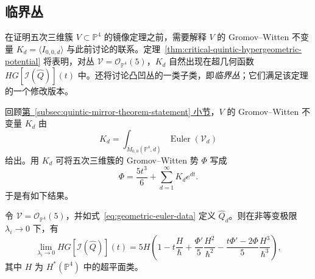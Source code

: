 \subsection{临界丛}\label{subsec:critical-bundles}
\hypertarget{source:373-batch8}{}
在证明五次三维簇 $V\subset\mathbb P^4$ 的镜像定理之前，需要解释 $V$ 的 Gromov--Witten 不变量 $K_d=\langle I_{0,0,d}\rangle$ 与此前讨论的联系。定理~\ref{thm:critical-quintic-hypergeometric-potential} 将表明，对丛 $\mathcal V=\mathcal O_{\mathbb P^4}(5)$，$K_d$ 自然出现在超几何函数 $HG[\mathcal I(\widehat Q)](t)$ 中。还将讨论凸凹丛的一类子类，即\emph{临界丛}；它们满足该定理的一个修改版本。

回顾\hyperref[subsec:quintic-mirror-theorem-statement]{第~\ref*{subsec:quintic-mirror-theorem-statement} 小节}，$V$ 的 Gromov--Witten 不变量 $K_d$ 由
\[
K_d=\int_{\overline M_{0,0}(\mathbb P^4,d)}\operatorname{Euler}(\mathcal V_d)
\]
给出。用 $K_d$ 可将五次三维簇的 Gromov--Witten 势 $\Phi$ 写成
\[
\Phi=\frac{5t^3}{6}+\sum_{d=1}^{\infty}K_de^{dt}.
\]
于是有如下结果。
\begin{theorem}\label{thm:critical-quintic-hypergeometric-potential}
令 $\mathcal V=\mathcal O_{\mathbb P^4}(5)$，并如式~\eqref{eq:geometric-euler-data} 定义 $\widehat Q_d$。则在非等变极限 $\lambda_i\to0$ 下，有
\[
\lim_{\lambda_i\to0}HG[\mathcal I(\widehat Q)](t)
=5H\left(1-t\frac H\hbar+\frac{\Phi'}5\frac{H^2}{\hbar^2}
-\frac{t\Phi'-2\Phi}5\frac{H^3}{\hbar^3}\right),
\]
其中 $H$ 为 $H^*(\mathbb P^4)$ 中的超平面类。
\end{theorem}
